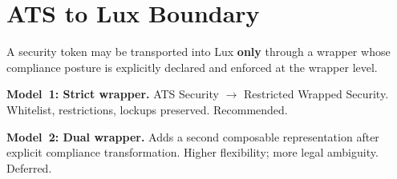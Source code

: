 \section{ATS to Lux Boundary}

\label{sec:ats-boundary}

\begin{requirement}
A security token may be transported into Lux \textbf{only} through a wrapper whose compliance posture is explicitly declared and enforced at the wrapper level.
\end{requirement}

\noindent\textbf{Model~1: Strict wrapper.} ATS Security $\to$ Restricted Wrapped Security. Whitelist, restrictions, lockups preserved. Recommended.

\noindent\textbf{Model~2: Dual wrapper.} Adds a second composable representation after explicit compliance transformation. Higher flexibility; more legal ambiguity. Deferred.


